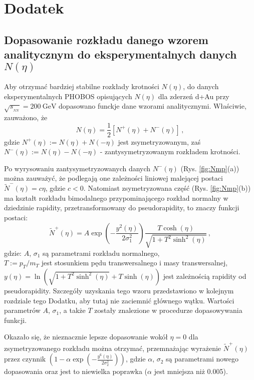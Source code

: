 \documentclass[a4paper,12pt]{article}
\begin{document}
\newpage
\appendix
\section{Dodatek}
\subsection{Dopasowanie rozkładu danego wzorem analitycznym do eksperymentalnych danych $N(\eta)$} \label{fity}
Aby otrzymać bardziej stabilne rozkłady krotności $N(\eta)$, do danych eksperymentalnych PHOBOS opisujących $N(\eta)$ dla zderzeń d+Au przy $\sqrt{s_{_{NN}}} = 200~\text{GeV}$ \cite{Back:2004mr} dopasowano funckje dane wzorami analitycznymi. Właściwie, zauważono, że
\begin{equation}
N(\eta) = \frac{1}{2}\left[N^+(\eta) + N^-(\eta)\right]\,,
\end{equation}
gdzie $N^+(\eta) := N(\eta)+N(-\eta)$ jest zsymetryzowanym, zaś \\
$N^-(\eta) := N(\eta)-N(-\eta)$ - zantysymetryzowanym rozkładem krotności.

Po wyrysowaniu zantysymetryzowanych danych $N^-(\eta)$ (Rys. \ref{fig:Nmp}(a)) można zauważyć, że podlegają one zależności liniowej malejącej postaci $\widetilde{N}^-(\eta) = c\eta$, gdzie $c < 0$. Natomiast zsymetryzowana część (Rys. \ref{fig:Nmp}(b)) ma kształt rozkładu bimodalnego przypominającego rozkład normalny w dziedzinie rapidity, przetransformowany do pseudorapidity, to znaczy funkcji postaci:
\begin{equation}\label{eq:fit-symmetr}
\widetilde{N}^+(\eta) = A \exp \left(- \frac{y^2(\eta)}{2 \sigma_1^2} \right) \frac{T \cosh(\eta)}{\sqrt{1 + T^2 \sinh^2(\eta)}}\,,
\end{equation}
gdzie: $A$, $\sigma_1$ są parametrami rozkładu normalnego, \\
$T := p_T/m_T$ jest stosunkiem pędu transwersalnego i masy transwersalnej, \\
$y(\eta) = \ln\left( \sqrt{1 + T^2 \sinh^2(\eta)} + T \sinh(\eta) \right)$ jest zależnością rapidity od pseudorapidity. Szczegóły uzyskania tego wzoru przedstawiono w kolejnym rozdziale tego Dodatku, aby tutaj nie zaciemnić głównego wątku. Wartości parametrów $A$, $\sigma_1$, a także $T$ zostały znalezione w procedurze dopasowywania funkcji.

Okazało się, że nieznacznie lepsze dopasowanie wokół $\eta = 0$ dla zsymetryzowanego rozkładu można otrzymać, przemnażając wyrażenie $\widetilde{N}^+(\eta)$ przez czynnik $\left(1 - \alpha\exp\left(- \frac{y^6(\eta)}{2\sigma_2^2}\right)\right)$, gdzie $\alpha$, $\sigma_2$ są parametrami nowego dopasowania oraz jest to niewielka poprawka ($\alpha$ jest mniejsza niż 0.005).
\end{document}
